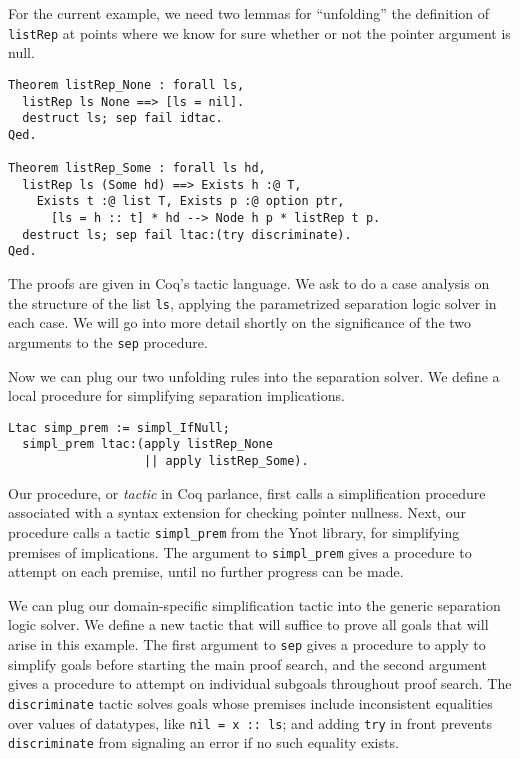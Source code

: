 \documentclass[preprint,nocopyrightspace]{sigplanconf}
\newcommand{\cd}[1]{\texttt{#1}}
\begin{document}
For the current example, we need two lemmas for ``unfolding'' the definition of \cd{listRep} at points where we know for sure whether or not the pointer argument is null.

\begin{verbatim}
Theorem listRep_None : forall ls,
  listRep ls None ==> [ls = nil].
  destruct ls; sep fail idtac.
Qed.

Theorem listRep_Some : forall ls hd,
  listRep ls (Some hd) ==> Exists h :@ T,
    Exists t :@ list T, Exists p :@ option ptr,
      [ls = h :: t] * hd --> Node h p * listRep t p.
  destruct ls; sep fail ltac:(try discriminate).
Qed.
\end{verbatim}

The proofs are given in Coq's tactic language.  We ask to do a case analysis on the structure of the list \cd{ls}, applying the parametrized separation logic solver in each case.  We will go into more detail shortly on the significance of the two arguments to the \cd{sep} procedure.

Now we can plug our two unfolding rules into the separation solver.  We define a local procedure for simplifying separation implications.

\begin{verbatim}
Ltac simp_prem := simpl_IfNull;
  simpl_prem ltac:(apply listRep_None
                   || apply listRep_Some).
\end{verbatim}

Our procedure, or \emph{tactic} in Coq parlance, first calls a simplification procedure associated with a syntax extension for checking pointer nullness.  Next, our procedure calls a tactic \cd{simpl\_prem} from the Ynot library, for simplifying premises of implications.  The argument to \cd{simpl\_prem} gives a procedure to attempt on each premise, until no further progress can be made.

We can plug our domain-specific simplification tactic into the generic separation logic solver.  We define a new tactic that will suffice to prove all goals that will arise in this example.  The first argument to \cd{sep} gives a procedure to apply to simplify goals before starting the main proof search, and the second argument gives a procedure to attempt on individual subgoals throughout proof search.  The \cd{discriminate} tactic solves goals whose premises include inconsistent equalities over values of datatypes, like \cd{nil = x :: ls}; and adding \cd{try} in front prevents \cd{discriminate} from signaling an error if no such equality exists.
\end{document}
